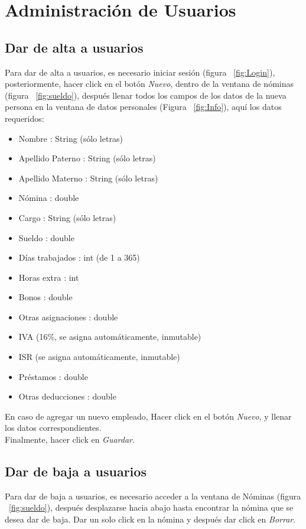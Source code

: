\documentclass[12pt]{amsart}
\begin{document}
\section{Administraci\'on de Usuarios}
\subsection{Dar de alta a usuarios}
{Para dar de alta a usuarios, es necesario iniciar sesi\'on (figura ~\ref{fig:Login}), posteriormente, hacer click en el bot\'on \textit{Nuevo}, dentro de la ventana de n\'ominas (figura ~\ref{fig:sueldo}), despu\'es llenar todos los campos de los datos de la nueva persona en la ventana de datos personales (Figura ~\ref{fig:Info}), aqu\'i los datos requeridos:}
\begin{itemize}
\item Nombre : String (s\'olo letras)
\item Apellido Paterno : String (s\'olo letras)
\item Apellido Materno : String (s\'olo letras)
\item N\'omina : double
\item Cargo : String (s\'olo letras)
\item Sueldo : double
\item D\'ias trabajados : int (de 1 a 365)
\item Horas extra : int
\item Bonos : double
\item Otras asignaciones : double
\item IVA (16\%, se asigna autom\'aticamente, inmutable)
\item ISR (se asigna autom\'aticamente, inmutable)
\item Pr\'estamos : double
\item Otras deducciones : double
\end{itemize}

{En caso de agregar un nuevo empleado, Hacer click en el bot\'on \textit{Nuevo}, y llenar los datos correspondientes.}\\


{ Finalmente, hacer click en \textit{Guardar}. }

\subsection{Dar de baja a usuarios}
{Para dar de baja a usuarios, es necesario acceder a la ventana de N\'ominas (figura ~\ref{fig:sueldo}), despu\'es desplazarse hacia abajo hasta encontrar la n\'omina que se desea dar de baja. Dar un solo click en la n\'omina y despu\'es dar click en \textit{Borrar}.}
\end{document}
